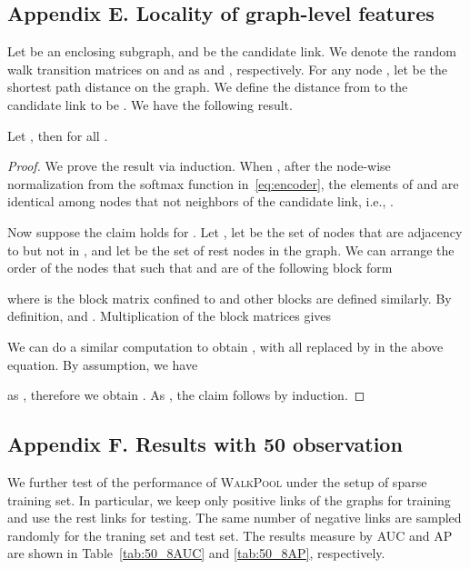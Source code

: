 \documentclass[11pt]{article}
\newcommand{\walkpool}{\textsc{WalkPool}\xspace}
\begin{document}
\subsection*{Appendix E. Locality of graph-level features}
Let  be an enclosing subgraph, and  be the candidate link. 
We denote the random walk transition matrices on  and  as  and , respectively. For any node , let  be the shortest path distance on the graph. We define the distance from  to the candidate link to be . We have the following result.
\begin{proposition}
Let , then  for all .
\end{proposition}
\begin{proof}
We prove the result via induction. When , after the node-wise normalization from the softmax function in~\eqref{eq:encoder}, the elements of  and  are identical among nodes that not neighbors of the candidate link, i.e., .

Now suppose the claim holds for . Let , let  be the set of nodes that are adjacency to but not in , and let  be the set of rest nodes in the graph.  We can arrange the order of the nodes that such that   and  are of the following block form

where  is the block matrix confined to  and other blocks are defined similarly. By definition,  and . Multiplication of the block matrices gives

We can do a similar computation to obtain , with all  replaced by  in the above equation. By assumption, we have

as , therefore we obtain . As , the claim follows by induction.
\end{proof}


\subsection*{Appendix F. Results with 50 observation}
We further test of the performance of \walkpool under the setup of sparse training set. In particular, we keep only  positive links of the graphs for training and use the rest links for testing. The same number of negative links are sampled randomly for the traning set and test set. The results measure by AUC and AP are shown in Table~\ref{tab:50_8AUC} and \ref{tab:50_8AP}, respectively. 
\end{document}
